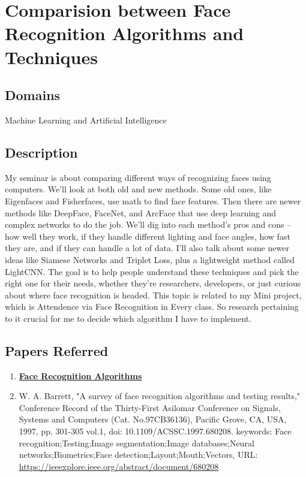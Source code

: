\documentclass[11pt]{article}
\begin{document}
\tableofcontents
\thispagestyle{empty}
\clearpage

\setcounter{page}{1}

\section{Comparision between Face Recognition Algorithms and Techniques}

\subsection{Domains}
Machine Learning and Artificial Intelligence
\subsection{Description}
My seminar is about comparing different ways of recognizing faces using computers. We'll look at both old and new methods. Some old ones, like Eigenfaces and Fisherfaces, use math to find face features. Then there are newer methods like DeepFace, FaceNet, and ArcFace that use deep learning and complex networks to do the job. We'll dig into each method's pros and cons – how well they work, if they handle different lighting and face angles, how fast they are, and if they can handle a lot of data. I'll also talk about some newer ideas like Siamese Networks and Triplet Loss, plus a lightweight method called LightCNN. The goal is to help people understand these techniques and pick the right one for their needs, whether they're researchers, developers, or just curious about where face recognition is headed. This topic is related to my Mini project, which is Attendence via Face Recognition in Every class. So research pertaining to it crucial for me to decide which algorithm I have to implement.

\subsection{Papers Referred}
\begin{enumerate}
    \item \href{https://www.ehu.eus/ccwintco/uploads/d/d2/PFC-IonMarqu%C3%A9s.pdf}{\textbf{Face Recognition Algorithms}}
    \item W. A. Barrett, "A survey of face recognition algorithms and testing results," Conference Record of the Thirty-First Asilomar Conference on Signals, Systems and Computers (Cat. No.97CB36136), Pacific Grove, CA, USA, 1997, pp. 301-305 vol.1, doi: 10.1109/ACSSC.1997.680208.
    keywords: {Face recognition;Testing;Image segmentation;Image databases;Neural networks;Biometrics;Face detection;Layout;Mouth;Vectors},
    URL: \url{https://ieeexplore.ieee.org/abstract/document/680208}
    
\end{enumerate}
\end{document}
